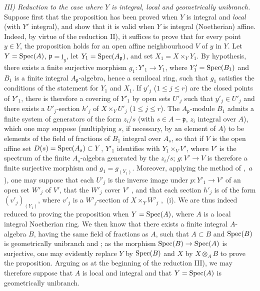 \emph{III) Reduction to the case where $Y$ is integral, local and geometrically unibranch.}
Suppose first that the proposition has been proved when $Y$ is integral and \emph{local} (with $Y'$ integral), and show that it is valid when $Y$ is integral (Noetherian) affine.
Indeed, by virtue of the reduction II), it suffices to prove that for every point $y\in Y$, the proposition holds for an open affine neighbourhood $V$ of $y$ in $Y$.
Let $Y=\operatorname{Spec}(A)$, $\mathfrak{p}=\mathfrak{j}_y$, let $Y_1=\operatorname{Spec}(A_\mathfrak{p})$, and set $X_1=X\times_Y Y_1$.
By hypothesis, there exists a finite surjective morphism $g_1:Y'_1\to Y_1$, where $Y'_1=\operatorname{Spec}(B_1)$ and $B_1$ is a finite integral $A_\mathfrak{p}$-algebra, hence a semilocal ring, such that $g_1$ satisfies the conditions of the statement for $Y_1$ and $X_1$.
If $y'_j$ ($1\leq j\leq r$) are the closed points of $Y'_1$, there is therefore a covering of $Y'_1$ by open sets $U'_j$ such that $y'_j\in U'_j$ and there exists a $U'_j$-section $h'_j$ of $X\times_Y U'_j$ ($1\leq j\leq r$).
The $A_\mathfrak{p}$-module $B_1$ admits a finite system of generators of the form $z_i/s$ (with $s\in A-\mathfrak{p}$,
$z_i$ integral over $A$), which one may suppose (multiplying $s$, if necessary, by an element of $A$) to be elements of the field of fractions of $B_1$ integral over $A_s$, so that if $V$ is the open affine set $D(s)=\operatorname{Spec}(A_s)\subset Y$, $Y'_1$ identifies with $Y_1\times_V V'$, where $V'$ is the spectrum of the finite $A_s$-algebra generated by the $z_i/s$; $g:V'\to V$ is therefore a finite surjective morphism and $g_1=g_{(Y_1)}$.
Moreover, applying the method of ,~$a$), one may suppose that each $U'_j$ is the inverse image under $p:Y'_1\to V'$ of an open set $W'_j$ of $V'$, that the $W'_j$ cover $V'$ , and that each section $h'_j$ is of the form $(v'_j)_{(Y_1)}$, where $v'_j$ is a $W'_j$-section of $X\times_Y W'_j$ ,~(i).
We are thus indeed reduced to proving the proposition when $Y=\operatorname{Spec}(A)$, where $A$ is a local integral Noetherian ring.
We then know that there exists a finite integral $A$-algebra $B$, having the same field of fractions as $A$, such that $A\subset B$ and $\operatorname{Spec}(B)$ is geometrically unibranch  and ; as the morphism $\operatorname{Spec}(B)\to\operatorname{Spec}(A)$ is surjective, one may evidently replace $Y$ by $\operatorname{Spec}(B)$ and $X$ by $X\otimes_A B$ to prove the proposition.
Arguing as at the beginning of the reduction III), we may therefore suppose that $A$ is local and integral and that $Y=\operatorname{Spec}(A)$ is geometrically unibranch.

